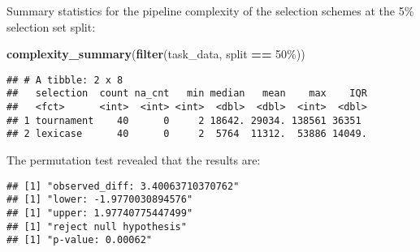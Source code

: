\documentclass[
]{book}
\newenvironment{Shaded}{\begin{snugshade}}{\end{snugshade}}
\newcommand{\AttributeTok}[1]{\textcolor[rgb]{0.13,0.29,0.53}{#1}}
\newcommand{\DecValTok}[1]{\textcolor[rgb]{0.00,0.00,0.81}{#1}}
\newcommand{\FunctionTok}[1]{\textcolor[rgb]{0.13,0.29,0.53}{\textbf{#1}}}
\newcommand{\NormalTok}[1]{#1}
\newcommand{\OtherTok}[1]{\textcolor[rgb]{0.56,0.35,0.01}{#1}}
\newcommand{\SpecialCharTok}[1]{\textcolor[rgb]{0.81,0.36,0.00}{\textbf{#1}}}
\newcommand{\StringTok}[1]{\textcolor[rgb]{0.31,0.60,0.02}{#1}}
\begin{document}
Summary statistics for the pipeline complexity of the selection schemes at the 5\% selection set split:

\begin{Shaded}
\begin{Highlighting}[]
\FunctionTok{complexity\_summary}\NormalTok{(}\FunctionTok{filter}\NormalTok{(task\_data, split }\SpecialCharTok{==} \StringTok{\textquotesingle{}50\%\textquotesingle{}}\NormalTok{))}
\end{Highlighting}
\end{Shaded}

\begin{verbatim}
## # A tibble: 2 x 8
##   selection  count na_cnt   min median   mean    max    IQR
##   <fct>      <int>  <int> <int>  <dbl>  <dbl>  <int>  <dbl>
## 1 tournament    40      0     2 18642. 29034. 138561 36351 
## 2 lexicase      40      0     2  5764  11312.  53886 14049.
\end{verbatim}

The permutation test revealed that the results are:

\begin{Shaded}
\end{Shaded}

\begin{verbatim}
## [1] "observed_diff: 3.40063710370762"
## [1] "lower: -1.9770030894576"
## [1] "upper: 1.97740775447499"
## [1] "reject null hypothesis"
## [1] "p-value: 0.00062"
\end{verbatim}
\end{document}

